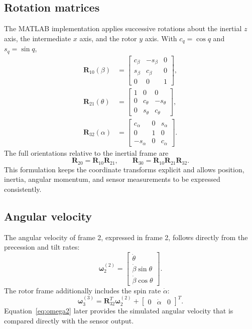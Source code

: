 \documentclass[11pt]{article}
\newcommand{\vect}[1]{\bm{#1}}
\newcommand{\mat}[1]{\bm{#1}}
\newcommand{\R}{\mat{R}}
\begin{document}
\subsection{Rotation matrices}
The MATLAB implementation applies successive rotations about the inertial $z$ axis, the intermediate $x$ axis, and the rotor $y$ axis. With $c_q=\cos q$ and $s_q=\sin q$,
\begin{align}
\R_{10}(\beta) &=
\begin{bmatrix}
 c_\beta & -s_\beta & 0\\
 s_\beta &  c_\beta & 0\\
 0 & 0 & 1
\end{bmatrix},\\[4pt]
\R_{21}(\theta) &=
\begin{bmatrix}
1 & 0 & 0\\
0 & c_\theta & -s_\theta\\
0 & s_\theta & c_\theta
\end{bmatrix},\\[4pt]
\R_{32}(\alpha) &=
\begin{bmatrix}
 c_\alpha & 0 & s_\alpha\\
 0 & 1 & 0\\
 -s_\alpha & 0 & c_\alpha
\end{bmatrix}.
\end{align}
The full orientations relative to the inertial frame are
\begin{equation}
    \R_{20}=\R_{10}\R_{21}, \qquad
    \R_{30}=\R_{10}\R_{21}\R_{32}.
\end{equation}
This formulation keeps the coordinate transforms explicit and allows position, inertia, angular momentum, and sensor measurements to be expressed consistently.

\subsection{Angular velocity}
The angular velocity of frame 2, expressed in frame 2, follows directly from the precession and tilt rates:
\begin{equation}
\vect{\omega}_{2}^{(2)}=
\begin{bmatrix}
\dot{\theta}\\
\dot{\beta}\sin\theta\\
\dot{\beta}\cos\theta
\end{bmatrix}.
\label{eq:omega2}
\end{equation}
The rotor frame additionally includes the spin rate $\dot{\alpha}$:
\begin{equation}
    \vect{\omega}_{3}^{(3)}
    = \R_{32}^{T}\vect{\omega}_{2}^{(2)}
    + \begin{bmatrix}0 & \dot{\alpha} & 0\end{bmatrix}^{T}.
\end{equation}
Equation~\eqref{eq:omega2} later provides the simulated angular velocity that is compared directly with the sensor output.
\end{document}

